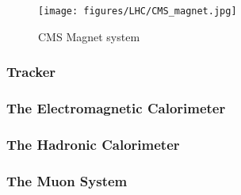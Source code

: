 \begin{figure}[!htbp]
	\centering
	\texttt{[image: figures/LHC/CMS\_magnet.jpg]}
	\caption{CMS Magnet system}
	\label{fig:CMS-magnet}
\end{figure}

\subsubsection{Tracker} %
\label{ssub:tracker}



\subsubsection{The Electromagnetic Calorimeter} %
\label{sub:the_electromagnetic_calorimeter}

\subsubsection{The Hadronic Calorimeter} %
\label{sub:the_hadronic_calorimeter}

\subsubsection{The Muon System} %
\label{sub:the_muon_system}





